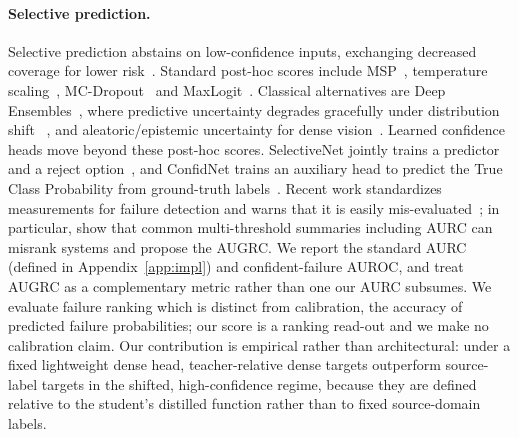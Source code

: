 \documentclass{article}
\begin{document}
\paragraph{Selective prediction.} Selective prediction abstains on low-confidence inputs, exchanging decreased coverage for lower risk~\cite{geifman2017selective}. Standard post-hoc scores include MSP~\cite{hendrycks2017baseline}, temperature scaling~\cite{guo2017calibration}, MC-Dropout~\cite{gal2016dropout} and MaxLogit~\cite{hendrycks2022scaling}. Classical alternatives are Deep Ensembles~\cite{lakshminarayanan2017deepensembles}, where predictive uncertainty degrades gracefully under distribution shift ~\cite{ovadia2019trust}, and aleatoric/epistemic uncertainty for dense vision~\cite{kendall2017uncertainties}. Learned confidence heads move beyond these post-hoc scores. SelectiveNet jointly trains a predictor and a reject option~\cite{geifman2019selectivenet}, and ConfidNet trains an auxiliary head to predict the True Class Probability from ground-truth labels~\cite{corbiere2019confidnet}. Recent work standardizes measurements for failure detection and warns that it is easily mis-evaluated~\cite{jaeger2023call, traub2024overcoming}; in particular, \citet{traub2024overcoming} show that common multi-threshold summaries including AURC can misrank systems and propose the AUGRC. We report the standard AURC (defined in Appendix~\ref{app:impl}) and confident-failure AUROC, and treat AUGRC as a complementary metric rather than one our AURC subsumes. We evaluate failure ranking which is distinct from calibration, the accuracy of predicted failure probabilities; our score is a ranking read-out and we make no calibration claim. Our contribution is empirical rather than architectural: under a fixed lightweight dense head, teacher-relative dense targets outperform source-label targets in the shifted, high-confidence regime, because they are defined relative to the student's distilled function rather than to fixed source-domain labels.
\end{document}
